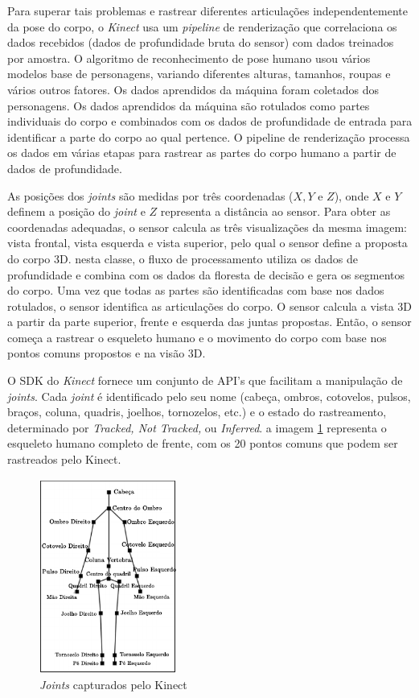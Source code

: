 Para superar tais problemas e rastrear diferentes articulações independentemente da pose do corpo, o \textit{Kinect} usa um \textit{pipeline} de renderização que correlaciona os dados recebidos (dados de profundidade bruta do sensor) com dados treinados por amostra. O algoritmo de reconhecimento de pose humano usou vários modelos base de personagens, variando diferentes alturas, tamanhos, roupas e vários outros fatores. Os dados aprendidos da máquina foram coletados dos personagens. Os dados aprendidos da máquina são rotulados como partes individuais do corpo e combinados com os dados de profundidade de entrada para identificar a parte do corpo ao qual pertence. O pipeline de renderização processa os dados em várias etapas para rastrear as partes do corpo humano a partir de dados de profundidade.

As posições dos \textit{joints} são medidas por três coordenadas ($X, Y$ e $Z$), onde $X$ e $Y$ definem a posição do \textit{joint} e $Z$ representa a distância ao sensor. Para obter as coordenadas adequadas, o sensor calcula as três visualizações da mesma imagem: vista frontal, vista esquerda e vista superior, pelo qual o sensor define a proposta do corpo 3D. nesta classe, o fluxo de processamento  utiliza os dados de profundidade e combina com os dados da floresta de decisão e gera os segmentos do corpo. Uma vez que todas as partes são identificadas com base nos dados rotulados, o sensor identifica as articulações do corpo. O sensor calcula a vista 3D a partir da parte superior, frente e esquerda das juntas propostas. Então, o sensor começa a rastrear o esqueleto humano e o movimento do corpo com base nos pontos comuns propostos e na visão 3D.

O SDK do \textit{Kinect} fornece um conjunto de API's que facilitam a manipulação de \textit{joints}. Cada \textit{joint} é identificado pelo seu nome (cabeça, ombros, cotovelos, pulsos, braços, coluna, quadris, joelhos, tornozelos, etc.) e o estado do rastreamento, determinado por \textit{Tracked, Not Tracked,} ou \textit{Inferred}. a imagem \ref{fig:human_joints} representa o esqueleto humano completo de frente, com os 20 pontos comuns que podem ser rastreados pelo Kinect.


\begin{figure}[h]
\centering
\includegraphics[width=0.4\textwidth]{images/human_joints.png}
\caption{\textit{Joints} capturados pelo Kinect}
\label{fig:human_joints}
\end{figure}


